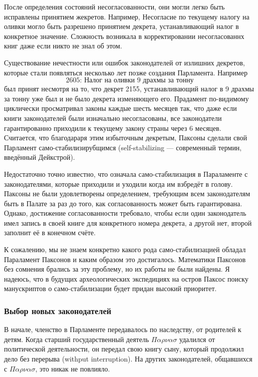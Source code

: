 \documentclass[12pt, a4paper]{article} %
\begin{document}
После определения состояний несогласованности, они могли легко быть исправлены принятием жекретов. Например, Несогласие по текущему налогу на оливки могло быть разрешено принятием декрета, устанавливающий налог в конкретное значение. Сложность возникала в корректировании несогласованнх книг даже если никто не знал об этом. 

Существование нечестности или ошибок законодателей от излишних декретов, которые стали появляться несколько лет позже создания Парламента. Например
\[
    \mbox{2605: Налог на оливки 9 драхмы за тонну}
\]
был принят несмотря на то, что декрет 2155, устанавливающий налог в 9 драхмы за тонну уже был и не было декрета изменяющего его. Прадамент по-видимому циклически просматривал законы каждые шесть месяцев так, что даже если книги законодателей были изначально несогласованы, все законодатели гарантированно приходили к текущему закону страны через 6 месяцев. Считается, что благодараря этим избыточным декретым, Паксоны сделали свой Парламент само-стабилизирубщимся (self-stabilizing --- современный термин, введённый Дейкстрой).

Недостаточно точно известно, что означала само-стабилизация в Параламенте с законодателями, которые приходили и уходили когда им взбредёт в голову. Паксоны не были удовлетворены определением, требующим всем законодателям быть в Палате за раз до того, как согласованность может быть гарантирована. Однако, достижение согласованности требовало, чтобы если один законодатель имел запись в своей книге для конкретного номера декрета, а другой нет, второй заполнит её в конечном счёте.

К сожалению, мы не знаем конкретно какого рода само-стабилизацией обладал Параламент Паксонов и каким образом это достигалось. Математики Паксонов без сомнения брались за эту проблему, но их работы не были найдены. Я надеюсь, что в будущих археологических экспедициях на остров Паксос поиску манускриптов о само-стабилизации будет придан высокий приоритет.

\subsubsection{Выбор новых законодателей}

В начале, членство в Парламенте передавалось по наследству, от родителей к детям. Когда старший государственный деятель $\Pi\alpha\rho\nu\alpha\sigma$ удалился от политической деятельности, он передал свою книгу сыну, который продолжил дело без перерыва (withput interruption). На других законодателей, общавшихся с $\Pi\alpha\rho\nu\alpha\sigma$, это никак не повлияло.
\end{document}
